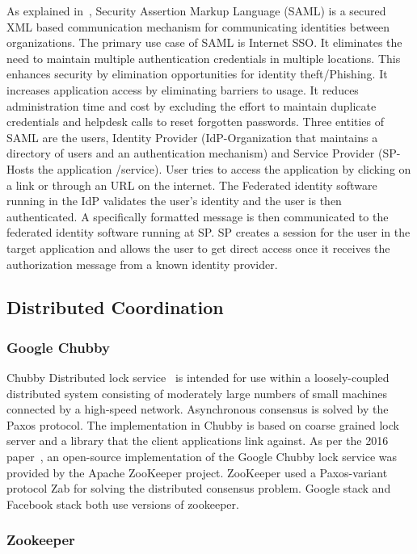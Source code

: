 As explained in~\cite{www-SAML}, Security Assertion Markup Language
(SAML) is a secured XML based communication mechanism for
communicating identities between organizations. The primary use case
of SAML is Internet SSO. It eliminates the need to maintain multiple
authentication credentials in multiple locations. This enhances
security by elimination opportunities for identity theft/Phishing. It
increases application access by eliminating barriers to usage. It
reduces administration time and cost by excluding the effort to
maintain duplicate credentials and helpdesk calls to reset forgotten
passwords. Three entities of SAML are the users, Identity Provider
(IdP-Organization that maintains a directory of users and an
authentication mechanism) and Service Provider (SP-Hosts the
application /service). User tries to access the application by
clicking on a link or through an URL on the internet. The Federated
identity software running in the IdP validates the user's identity and
the user is then authenticated. A specifically formatted message is
then communicated to the federated identity software running at SP. SP
creates a session for the user in the target application and allows
the user to get direct access once it receives the authorization
message from a known identity provider.

\subsection{Distributed Coordination}


\subsubsection{Google Chubby \cv}

Chubby Distributed lock service~\cite{www-chubby} is intended for use
within a loosely-coupled distributed system consisting of moderately
large numbers of small machines connected by a high-speed
network. Asynchronous consensus is solved by the Paxos protocol. The
implementation in Chubby is based on coarse grained lock server and a
library that the client applications link against.  As per the 2016
paper~\cite{chubby-paper-2016}, an open-source implementation of the
Google Chubby lock service was provided by the Apache ZooKeeper
project. ZooKeeper used a Paxos-variant protocol Zab for solving the
distributed consensus problem.  Google stack and Facebook stack both
use versions of zookeeper.
     
\subsubsection{Zookeeper \cv}
 
